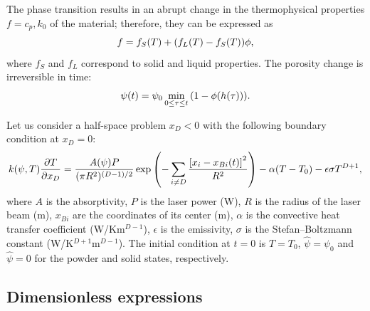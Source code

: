 \documentclass{article}
\newcommand{\Hpsi}{\hat{\psi}}
\begin{document}
The phase transition results in an abrupt change in the thermophysical properties \(f=c_p,k_0\) of the material;
therefore, they can be expressed as
\begin{equation}\label{eq:fusion_change}
	f = f_S(T) + \qty( f_L(T) - f_S(T) )\phi,
\end{equation}
where \(f_S\) and \(f_L\) correspond to solid and liquid properties.
The porosity change is irreversible in time:
\begin{equation}\label{eq:porosity}
	\psi(t) = \psi_0\min_{0\leq\tau\leq t}\qty( 1-\phi(h(\tau)) ).
\end{equation}

Let us consider a half-space problem \(x_D<0\) with the following boundary condition at \(x_D=0\):
\begin{equation}\label{eq:bc}
	k(\psi,T)\pdv{T}{x_D} = \frac{A(\psi)P}{(\pi R^2)^{(D-1)/2}}\exp\qty( -\sum_{i\neq D}\frac{\qty[x_i-x_{Bi}(t)]^2}{R^2} )
	    - \alpha(T-T_0) - \epsilon\sigma T^{D+1},
\end{equation}
where \(A\) is the absorptivity, \(P\) is the laser power (\si{W}), \(R\) is the radius of the laser beam (\si{m}),
\(x_{Bi}\) are the coordinates of its center (\si{m}), \(\alpha\) is the convective heat transfer coefficient (\si{W/Km}\(^{D-1}\)),
\(\epsilon\) is the emissivity, \(\sigma\) is the Stefan--Boltzmann constant (\si{W/K}\(^{D+1}\)\si{m}\(^{D-1}\)).
The initial condition at \(t=0\) is \(T=T_0\), \(\Hpsi = \psi_0\) and \(\Hpsi = 0\) for the powder and solid states, respectively.

\subsection{Dimensionless expressions}
\end{document}
